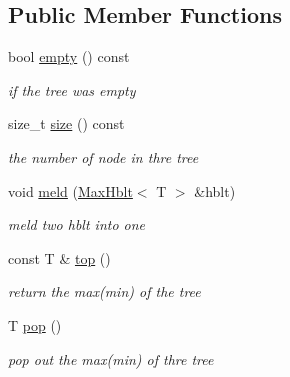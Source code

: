\subsection*{Public Member Functions}
\begin{DoxyCompactItemize}
\item 
\mbox{\label{classMaxHblt_ac748ad969d08dd24d4ade6595acd7002}} 
bool \hyperlink{classMaxHblt_ac748ad969d08dd24d4ade6595acd7002}{empty} () const
\begin{DoxyCompactList}\small\item\em if the tree was empty \end{DoxyCompactList}\item 
\mbox{\label{classMaxHblt_ae8a4af940e3e9f8f346c63f0407a72cd}} 
size\+\_\+t \hyperlink{classMaxHblt_ae8a4af940e3e9f8f346c63f0407a72cd}{size} () const
\begin{DoxyCompactList}\small\item\em the number of node in thre tree \end{DoxyCompactList}\item 
\mbox{\label{classMaxHblt_a70f1601764e0f511357f06e4eed074dc}} 
void \hyperlink{classMaxHblt_a70f1601764e0f511357f06e4eed074dc}{meld} (\hyperlink{classMaxHblt}{Max\+Hblt}$<$ T $>$ \&hblt)
\begin{DoxyCompactList}\small\item\em meld two hblt into one \end{DoxyCompactList}\item 
\mbox{\label{classMaxHblt_a6c5f2a416535abc326c5e90f7f0f7c3b}} 
const T \& \hyperlink{classMaxHblt_a6c5f2a416535abc326c5e90f7f0f7c3b}{top} ()
\begin{DoxyCompactList}\small\item\em return the max(min) of the tree \end{DoxyCompactList}\item 
\mbox{\label{classMaxHblt_a5941b294086c496fc4eff6e7ebc6b27f}} 
T \hyperlink{classMaxHblt_a5941b294086c496fc4eff6e7ebc6b27f}{pop} ()
\begin{DoxyCompactList}\small\item\em pop out the max(min) of thre tree \end{DoxyCompactList}\item 

\end{DoxyCompactItemize}
